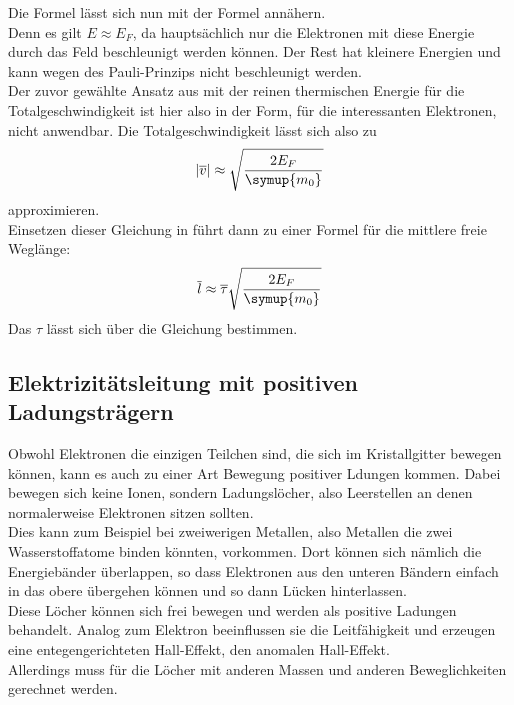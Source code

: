 \noindent
Die Formel  lässt sich nun mit der Formel  annähern.\\
Denn es gilt  $ E\approx E_F$, da hauptsächlich nur die Elektronen mit diese Energie durch das Feld beschleunigt werden können.
Der Rest hat kleinere Energien und kann wegen des Pauli-Prinzips nicht beschleunigt werden.\\
Der zuvor gewählte Ansatz aus  mit der reinen thermischen Energie für die Totalgeschwindigkeit ist hier also in der Form, für die interessanten Elektronen, nicht anwendbar.
Die Totalgeschwindigkeit lässt sich also zu 
\begin{equation}
  |\overline{v}| \approx \sqrt{\frac{2E_F}{\symup{m_0}}}
\end{equation}
approximieren.\\
Einsetzen dieser Gleichung in  führt dann zu einer Formel für die mittlere freie Weglänge:
\begin{equation}
  \overline{l} \approx \overline{\tau} \sqrt{\frac{2E_F}{\symup{m_0}}}
\end{equation}
Das $\tau$ lässt sich über die Gleichung  bestimmen.\\





\subsection{Elektrizitätsleitung mit positiven Ladungsträgern}

Obwohl Elektronen die einzigen Teilchen sind, die sich im Kristallgitter bewegen können, kann es auch zu einer Art Bewegung positiver Ldungen kommen.
Dabei bewegen sich keine Ionen, sondern Ladungslöcher, also Leerstellen an denen normalerweise Elektronen sitzen sollten.\\
Dies kann zum Beispiel bei zweiwerigen Metallen, also Metallen die zwei Wasserstoffatome binden könnten, vorkommen.
Dort können sich nämlich die Energiebänder überlappen, so dass Elektronen aus den unteren Bändern einfach in das obere übergehen können und so 
dann Lücken hinterlassen.\\
Diese Löcher können sich frei bewegen und werden als positive Ladungen behandelt. Analog zum Elektron beeinflussen sie die Leitfähigkeit und erzeugen
eine entegengerichteten Hall-Effekt, den anomalen Hall-Effekt.\\
Allerdings muss für die Löcher mit anderen Massen und anderen Beweglichkeiten gerechnet werden.





